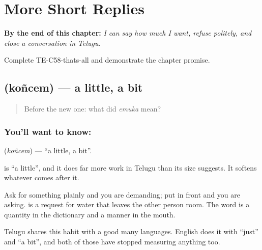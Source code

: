 
\chapter{More Short Replies}
\label{ch:te-more-replies}

\begin{chapteropening}
\textbf{By the end of this chapter:} \emph{I can say how much I want, refuse politely, and close a conversation in Telugu.}

Complete TE-C58-thats-all and demonstrate the chapter promise.
\end{chapteropening}

\section[\texorpdfstring{\te{కొంచెం} (koñcem)}{కొంచెం (koñcem)}]{ (koñcem) — a little, a bit}

\label{lesson:TE-C58-a-little}



\begin{quote}
Before the new one: what did \emph{emuka} mean?
\end{quote}

\subsection*{You'll want to know: }
\textbf{} (\emph{koñcem}) — \textquotedblleft{}a little, a bit\textquotedblright{}.

 is \textquotedblleft{}a little\textquotedblright{}, and it does far more work in Telugu than its size suggests. It softens whatever comes after it.

Ask for something plainly and you are demanding; put  in front and you are asking.   is a request for water that leaves the other person room. The word is a quantity in the dictionary and a manner in the mouth.

Telugu shares this habit with a good many languages. English does it with \textquotedblleft{}just\textquotedblright{} and \textquotedblleft{}a bit\textquotedblright{}, and both of those have stopped measuring anything too.

